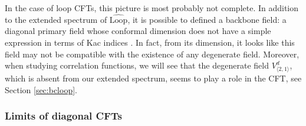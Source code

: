\documentclass[12pt, a4paper]{article}
\begin{document}
In the case of loop CFTs, this picture is most probably not complete. In addition to the extended spectrum of $\widehat{\text{Loop}}$, it is possible to defined a backbone field: a diagonal primary field whose conformal dimension does not have a simple expression in terms of Kac indices \cite{nqsz23}. In fact, from its dimension, it looks like this field may not be compatible with the existence of any degenerate field. Moreover, when studying correlation functions, we will see that the degenerate field $V^d_{\langle 2,1\rangle}$, which is absent from our extended spectrum, seems to play a role in the CFT, see Section \ref{sec:bcloop}.

\subsubsection{Limits of diagonal CFTs}\label{sec:lod}
\end{document}
